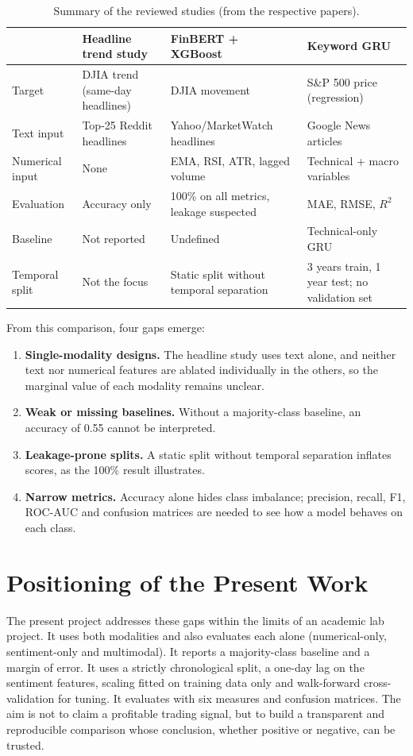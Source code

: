 \begin{table}[!htbp]
\centering
\small
\renewcommand{\arraystretch}{1.25}
\begin{tabularx}{\textwidth}{@{}p{2.7cm}XXX@{}}
\toprule
 & Headline trend study~\cite{nlpheadlines2018} & FinBERT + XGBoost~\cite{hybridfinbert} & Keyword GRU~\cite{groupshap2025} \\
\midrule
Target & DJIA trend (same-day headlines) & DJIA movement & S\&P 500 price (regression) \\
Text input & Top-25 Reddit headlines & Yahoo/MarketWatch headlines & Google News articles \\
Numerical input & None & EMA, RSI, ATR, lagged volume & Technical + macro variables \\
Evaluation & Accuracy only & 100\% on all metrics, leakage suspected & MAE, RMSE, $R^2$ \\
Baseline & Not reported & Undefined & Technical-only GRU \\
Temporal split & Not the focus & Static split without temporal separation & 3 years train, 1 year test; no validation set \\
\bottomrule
\end{tabularx}
\caption{Summary of the reviewed studies (from the respective papers).}
\label{tab:gaps}
\end{table}

From this comparison, four gaps emerge:
\begin{enumerate}
  \item \textbf{Single-modality designs.} The headline study uses text alone, and neither text nor numerical features are ablated individually in the others, so the marginal value of each modality remains unclear.
  \item \textbf{Weak or missing baselines.} Without a majority-class baseline, an accuracy of 0.55 cannot be interpreted.
  \item \textbf{Leakage-prone splits.} A static split without temporal separation inflates scores, as the 100\% result illustrates.
  \item \textbf{Narrow metrics.} Accuracy alone hides class imbalance; precision, recall, F1, ROC-AUC and confusion matrices are needed to see how a model behaves on each class.
\end{enumerate}

\section{Positioning of the Present Work}
The present project addresses these gaps within the limits of an academic lab project. It uses both modalities and also evaluates each alone (numerical-only, sentiment-only and multimodal). It reports a majority-class baseline and a margin of error. It uses a strictly chronological split, a one-day lag on the sentiment features, scaling fitted on training data only and walk-forward cross-validation for tuning. It evaluates with six measures and confusion matrices. The aim is not to claim a profitable trading signal, but to build a transparent and reproducible comparison whose conclusion, whether positive or negative, can be trusted.
